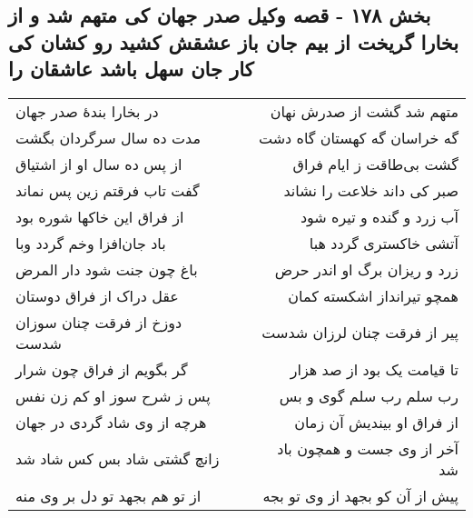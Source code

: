 \begin{center}
\section*{بخش ۱۷۸ - قصه وکیل صدر جهان کی متهم شد و از بخارا گریخت از بیم جان باز عشقش کشید رو کشان کی کار جان سهل باشد عاشقان را}
\label{sec:sh178}
\begin{longtable}{l p{0.5cm} r}
در بخارا بندهٔ صدر جهان
&&
متهم شد گشت از صدرش نهان
\\
مدت ده سال سرگردان بگشت
&&
گه خراسان گه کهستان گاه دشت
\\
از پس ده سال او از اشتیاق
&&
گشت بی‌طاقت ز ایام فراق
\\
گفت تاب فرقتم زین پس نماند
&&
صبر کی داند خلاعت را نشاند
\\
از فراق این خاکها شوره بود
&&
آب زرد و گنده و تیره شود
\\
باد جان‌افزا وخم گردد وبا
&&
آتشی خاکستری گردد هبا
\\
باغ چون جنت شود دار المرض
&&
زرد و ریزان برگ او اندر حرض
\\
عقل دراک از فراق دوستان
&&
همچو تیرانداز اشکسته کمان
\\
دوزخ از فرقت چنان سوزان شدست
&&
پیر از فرقت چنان لرزان شدست
\\
گر بگویم از فراق چون شرار
&&
تا قیامت یک بود از صد هزار
\\
پس ز شرح سوز او کم زن نفس
&&
رب سلم رب سلم گوی و بس
\\
هرچه از وی شاد گردی در جهان
&&
از فراق او بیندیش آن زمان
\\
زانچ گشتی شاد بس کس شاد شد
&&
آخر از وی جست و همچون باد شد
\\
از تو هم بجهد تو دل بر وی منه
&&
پیش از آن کو بجهد از وی تو بجه
\\
\end{longtable}
\end{center}
